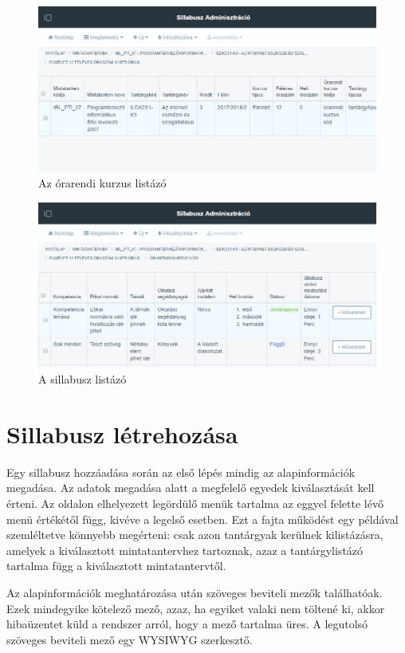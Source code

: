 \documentclass[hidelinks, 12pt, a4paper]{report}
\begin{document}
\begin{figure}[H]
    \centering
	\includegraphics[width=\textwidth]{sm_timetable_course_list.png}
	\caption{Az órarendi kurzus listázó}
\end{figure}

\begin{figure}[H]
    \centering
	\includegraphics[width=\textwidth]{sm_syllabus_list.png}
	\caption{A sillabusz listázó}
\end{figure}

\section{Sillabusz létrehozása}

Egy sillabusz hozzáadása során az első lépés mindig az alapinformációk megadása. Az adatok megadása alatt a megfelelő egyedek kiválasztását kell érteni. Az oldalon elhelyezett legördülő menük tartalma az eggyel felette lévő menü értékétől függ, kivéve a legelső esetben. Ezt a fajta működést egy példával szemléltetve könnyebb megérteni: csak azon tantárgyak kerülnek kilistázásra, amelyek a kiválasztott mintatantervhez tartoznak, azaz a tantárgylistázó tartalma függ a kiválasztott mintatantervtől.

Az alapinformációk meghatározása után szöveges beviteli mezők találhatóak. Ezek mindegyike kötelező mező, azaz, ha egyiket valaki nem töltené ki, akkor hibaüzentet küld a rendszer arról, hogy a mező tartalma üres. A legutolsó szöveges beviteli mező egy WYSIWYG szerkesztő.
\end{document}
